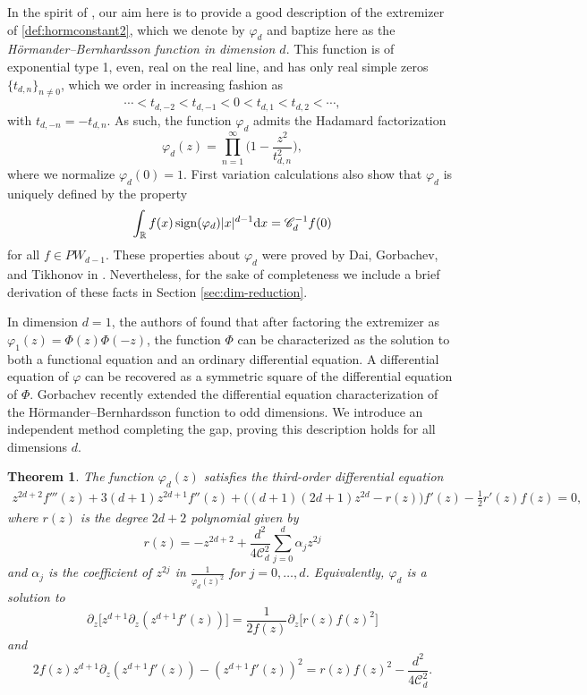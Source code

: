 \documentclass[a4paper,reqno,12pt]{amsart}
\newtheorem{theorem}{Theorem}
\newcommand{\C}{\mathscr{C}}
\renewcommand{\P}{\Phi}
\renewcommand{\r}{\mathbb{R}}
\newcommand{\p}{\varphi}
\renewcommand{\d}{{\rm d}}
\newcommand{\sign}{{\rm sign}}
\begin{document}
In the spirit of \cite{BORS2}, our aim here is to provide a good description of the extremizer of \eqref{def:hormconstant2}, which we denote by $\p_d$ and baptize here as the \textit{Hörmander--Bernhardsson function in dimension $d$}.
This function is of exponential type 1, even, real on the real line, and
has only real simple zeros $\{t_{d,n}\}_{n \neq 0}$, which we order in increasing fashion as
$$
\cdots<t_{d,-2}<t_{d,-1}<0<t_{d,1}<t_{d,2}<\cdots,
$$
with $t_{d,-n}=-t_{d,n}$. As such, the function $\p_d$ admits the Hadamard factorization
$$
    \p_d(z) = \prod_{n = 1}^\infty \bigg( 1- \frac{z^2}{t_{d,n}^2} \bigg),
$$
where we normalize $\p_d(0)=1$. First variation calculations also show that $\p_d$ is uniquely defined by the property
\begin{align}\label{id:integralinterp}
\int_{\r} f(x) \,\sign(\p_d) |x|^{d-1}\d x = {\C_d^{-1}} f(0)
\end{align} 
for all $f\in PW_{d-1}$. 
These properties about $\p_d$ were proved by Dai, Gorbachev, and Tikhonov in \cite{DGT}. Nevertheless, for the sake of completeness we include a brief derivation of these facts in Section \ref{sec:dim-reduction}.

In dimension $d = 1$, the authors of \cite{BORS2} found that after factoring the extremizer as $\p_1(z) = \P(z) \P(-z)$, the function $\P$ can be characterized as the solution to both a functional equation and an ordinary differential equation. A differential equation of $\p$ can be recovered as a symmetric square of the differential equation of $\P$. Gorbachev \cite{Gor2} recently extended the differential equation characterization of the H\"ormander--Bernhardsson function to odd dimensions. We introduce an independent method completing the gap, proving this description holds for all dimensions $d$.

\begin{theorem}\label{thm:ode}
The function $\p_d(z)$ satisfies the third-order differential equation
\begin{align*}
    z^{2d+2}f'''(z) +3(d+1)z^{2d+1}f''(z) +\big((d+1)(2d+1)z^{2d} -r(z) \big)f'(z) - \frac12 r'(z)f(z) = 0,
\end{align*}
where $r(z)$ is the degree $2d + 2$ polynomial given by
\begin{equation*}
    r(z) =  - z^{2d+2} +  \frac{d^2}{4\C_d^2} \sum_{j = 0}^{d } \alpha_{j} z^{2j}
\end{equation*}
and $\alpha_j$ is the coefficient of $z^{2j}$ in $\frac{1}{\p_d(z)^2}$ for  $j = 0, \ldots, d$. Equivalently, $\p_d$ is a solution to 
\begin{equation*}
    \partial_z\big[z^{d+1}\partial_z(z^{d+1}f'(z))\big]
    =\frac{1}{2f(z)} \partial_z\big[r(z) f(z)^2\big]
\end{equation*}
and
\begin{equation*}
    2f(z) z^{d+1} \partial_z( z^{d+1}f'(z) ) - (z^{d+1}f'(z))^2 = r(z) f(z)^2-\frac{d^2}{4\C_d^2}.
\end{equation*}
\end{theorem}
\end{document}
